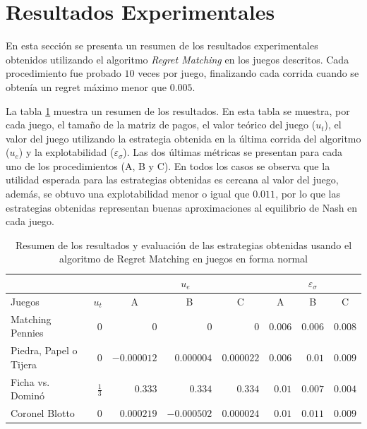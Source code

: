 \section{Resultados Experimentales}

En esta sección se presenta un resumen de los resultados experimentales obtenidos utilizando el algoritmo \textit{Regret Matching} en los juegos descritos. Cada procedimiento fue probado $10$ veces por juego, finalizando cada corrida cuando se obtenía un regret máximo menor que $0.005$.

La tabla \ref{tab:resumen-resultados-RM} muestra un resumen de los resultados. En esta tabla se muestra, por cada juego, el tamaño de la matriz de pagos, el valor teórico del juego ($u_t$), el valor del juego utilizando la estrategia obtenida en la última corrida del algoritmo ($u_e$) y la explotabilidad ($\varepsilon_{\sigma}$). Las dos últimas métricas se presentan para cada uno de los procedimientos (A, B y C). En todos los casos se observa que la utilidad esperada para las estrategias obtenidas es cercana al valor del juego, además, se obtuvo una explotabilidad menor o igual que $0.011$, por lo que las estrategias obtenidas representan buenas aproximaciones al equilibrio de Nash en cada juego.

\begin{table}[htpb]
    \centering
    \begin{tabular}{l|r|r r r|r r r}
        &  & \multicolumn{3}{|c}{$u_e$} & \multicolumn{3}{|c}{$\varepsilon_{\sigma}$}  \\ \hline
        Juegos & $u_t$ & \multicolumn{1}{|c}{A} & \multicolumn{1}{c}{B} & \multicolumn{1}{c|}{C}
          & \multicolumn{1}{|c}{A} & \multicolumn{1}{c}{B} & \multicolumn{1}{c}{C} \\ \hline
        Matching Pennies
            & $0$ & $0$ & $0$ & $0$ & $0.006$ & $0.006$ & $0.008$ \\
        Piedra, Papel o Tijera
            & $0$ & $-0.000012$ & $0.000004$ & $0.000022$ & $0.006$ & $0.01$ & $0.009$ \\
        Ficha vs. Dominó
            & $\frac{1}{3}$ & $0.333$ & $0.334$ & $0.334$ & $0.01$ & $0.007$ & $0.004$ \\
        Coronel Blotto
            & $0$ & $0.000219$ & $-0.000502$ & $0.000024$ & $0.01$ & $0.011$ & $0.009$ \\
        \hline
    \end{tabular}
    \caption{Resumen de los resultados y evaluación de las estrategias obtenidas usando el algoritmo de Regret Matching en juegos en forma normal}
    \label{tab:resumen-resultados-RM}
\end{table}

